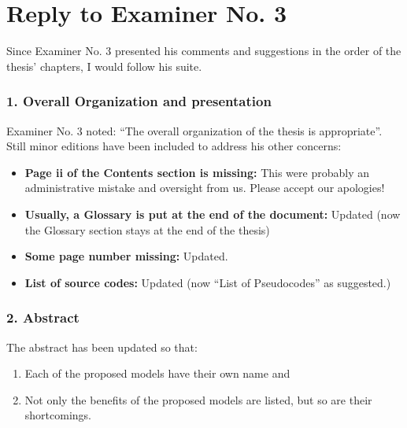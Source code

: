 \section*{Reply to Examiner No. 3}

\begin{replyheader}
\end{replyheader}  

Since Examiner No. 3 presented his comments and suggestions in the order of the thesis' chapters, 
  I would follow his suite.

\subsubsection*{1. Overall Organization and presentation}

Examiner No. 3 noted: ``The overall organization of the thesis is appropriate''.
Still minor editions have been included to address his  other concerns:


\begin{itemize}
  \item \textbf{Page ii of the Contents section is missing:} This were probably an administrative mistake and oversight from us. Please accept our apologies!
  \item \textbf{Usually, a Glossary is put at the end of the document: } Updated (now the Glossary section stays at the end of the thesis)
  \item \textbf{Some page number missing: } Updated. 
  \item \textbf{List of source codes: } Updated (now ``List of Pseudocodes'' as suggested.)
\end{itemize}

\subsubsection*{2. Abstract}

The abstract has been updated so that:
\begin{enumerate}[topsep=0pt]
  \item Each of the proposed models have their own name and
  \item Not only the benefits of the proposed models are listed, but so are their shortcomings.
\end{enumerate}

